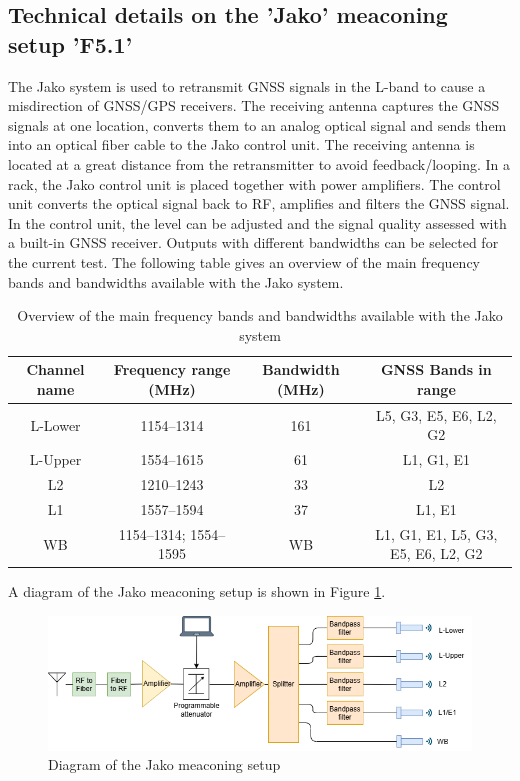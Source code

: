 \subsection{Technical details on the 'Jako' meaconing setup 'F5.1'}
The Jako system is used to retransmit GNSS signals in the L-band to cause a misdirection of GNSS/GPS receivers. The receiving antenna captures the GNSS signals at one location, converts them to an analog optical signal and sends them into an optical fiber cable to the Jako control unit. The receiving antenna is located at a great distance from the retransmitter to avoid feedback/looping.
In a rack, the Jako control unit is placed together with power amplifiers. The control unit converts the optical signal back to RF, amplifies and filters the GNSS signal. In the control unit, the level can be adjusted and the signal quality assessed with a built-in GNSS receiver. Outputs with different bandwidths can be selected for the current test. The following table gives an overview of the main frequency bands and bandwidths available with the Jako system.

\begin{table}[H]
\begin{tabular}{|c|c|c|c|}
\hline
\rowcolor[HTML]{C0C0C0}
\textbf{Channel name} & \textbf{Frequency range (MHz)} & \textbf{Bandwidth (MHz)} & \textbf{GNSS Bands in range} \\
\hline
L-Lower & 1154--1314 & 161 & L5, G3, E5, E6, L2, G2  \\
\hline
L-Upper & 1554--1615 & 61 & L1, G1, E1 \\
\hline
L2 & 1210--1243 & 33 & L2 \\
\hline
L1 & 1557--1594 & 37 & L1, E1 \\
\hline
WB & 1154--1314; 1554--1595 & WB & L1, G1, E1, L5, G3, E5, E6, L2, G2 \\
\hline
\end{tabular}
\caption{Overview of the main frequency bands and bandwidths available with the Jako system}
\end{table}

A diagram of the Jako meaconing setup is shown in Figure \ref{fig:Jako system}.
\begin{figure}[H]
    \includegraphics[width=\textwidth]{graphics/appendixG/Jako.png}
    \caption{Diagram of the Jako meaconing setup}
    \label{fig:Jako system}
\end{figure}

\newpage
